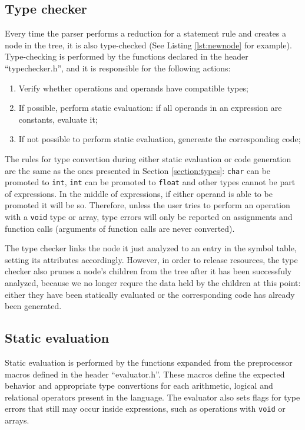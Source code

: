 \subsection{Type checker}
\label{section:tc}

Every time the parser performs a reduction for a statement rule and
creates a node in the tree, it is also type-checked
(See Listing \ref{lst:newnode} for example).
Type-checking is performed by the functions declared
in the header ``typechecker.h'', and it is responsible
for the following actions:

\begin{enumerate}
 \item Verify whether operations and operands have compatible types;
 \item If possible, perform static evaluation: if all operands in an expression are constants, evaluate it;
 \item If not possible to perform static evaluation, genereate the corresponding code;
\end{enumerate}

The rules for type convertion during either static evaluation
or code generation are the same as the ones presented in Section
\ref{section:types}:
\texttt{char} can be promoted to \texttt{int},
\texttt{int} can be promoted to \texttt{float} and other types cannot
be part of expressions. In the middle of expressions, if either operand
is able to be promoted it will be so. Therefore, unless the user tries
to perform an operation with a \texttt{void} type or array, type errors
will only be reported on assignments and function calls (arguments of
function calls are never converted).


The type checker links the node it just analyzed to an entry in the symbol table,
setting its attributes accordingly. However, in order to release resources,
the type checker also prunes a node's children from the tree after it has been successfuly analyzed,
because we no longer requre the data held by the children at this point: either they have
been statically evaluated or the corresponding code has already been generated.

\subsection{Static evaluation}

Static evaluation is performed by the functions expanded from the
preprocessor macros defined in the header ``evaluator.h''. These
macros define the expected behavior and appropriate type convertions
for each arithmetic, logical and relational operators present in the
language. The evaluator also sets flags for type errors that still
may occur inside expressions, such as operations with \texttt{void} or
arrays.

